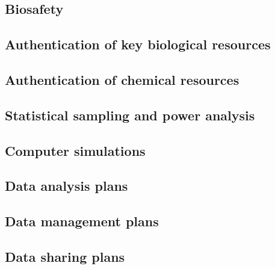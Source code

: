 \documentclass[11pt,letterpaper]{article}
\begin{document}
\subsection{Biosafety}
\label{sec:org45405fc}




\subsection{Authentication of key biological resources}
\label{sec:org1fc8a03}


\subsection{Authentication of chemical resources}
\label{sec:orgbaf9894}


\subsection{Statistical sampling and power analysis}
\label{sec:org40c4c5e}



\subsection{Computer simulations}
\label{sec:org8c81f3c}


\subsection{Data analysis plans}
\label{sec:org565de05}




\subsection{Data management plans}
\label{sec:orgb344dfa}




\subsection{Data sharing plans}
\label{sec:orgb3e33b3}
\end{document}
